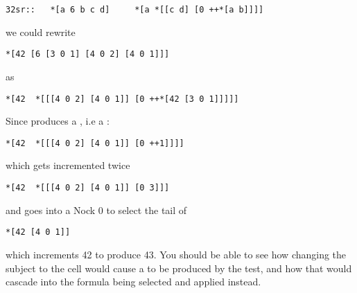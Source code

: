 \begin{framed_shaded}
\begin{Verbatim}[fontsize=\relsize{-2.5},fontseries=b,commandchars=\\\{\}]
32sr::   *[a 6 b c d]     *[a *[[c d] [0 ++*[a b]]]]
\end{Verbatim}
\end{framed_shaded}
we could rewrite 

\begin{framed_shaded}
\begin{Verbatim}[fontsize=\relsize{-2.5},fontseries=b,commandchars=\\\{\}]
*[42 [6 [3 0 1] [4 0 2] [4 0 1]]]
\end{Verbatim}
\end{framed_shaded}
as 

\begin{framed_shaded}
\begin{Verbatim}[fontsize=\relsize{-2.5},fontseries=b,commandchars=\\\{\}]
*[42  *[[[4 0 2] [4 0 1]] [0 ++*[42 [3 0 1]]]]]
\end{Verbatim}
\end{framed_shaded}
Since \kode{*[42 [3 0 1]]} produces a , i.e a :

\begin{framed_shaded}
\begin{Verbatim}[fontsize=\relsize{-2.5},fontseries=b,commandchars=\\\{\}]
*[42  *[[[4 0 2] [4 0 1]] [0 ++1]]]]
\end{Verbatim}
\end{framed_shaded}
which gets incremented twice
\begin{framed_shaded}
\begin{Verbatim}[fontsize=\relsize{-2.5},fontseries=b,commandchars=\\\{\}]
*[42  *[[[4 0 2] [4 0 1]] [0 3]]]
\end{Verbatim}
\end{framed_shaded}
and goes into a Nock 0 to select the tail of \kode{[[4 0 2] [4 0 1]]}

\begin{framed_shaded}
\begin{Verbatim}[fontsize=\relsize{-2.5},fontseries=b,commandchars=\\\{\}]
*[42 [4 0 1]]
\end{Verbatim}
\end{framed_shaded}
which increments 42 to produce 43. You should be able to see how changing the subject to the cell \kode{[40 43]} would cause a  to be produced by the test, and how that would cascade into the  formula \kode{[4 0 2]} being selected and applied instead.


